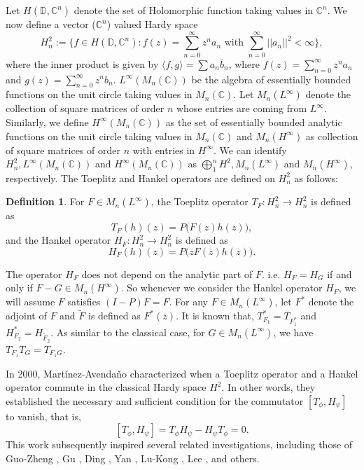 \documentclass[12pt, reqno]{amsart}
\theoremstyle{definition}
\newtheorem{definition}[theorem]{Definition}
\theoremstyle{remark}
\numberwithin{equation}{section}
\begin{document}
    
    Let $H(\mathbb{D}, \mathbb{C}^n)$ denote the set of Holomorphic function taking values in $\mathbb{C}^n.$ We now define a vector ($\mathbb{C}^n$) valued Hardy space 
    \begin{equation*}
        H^2_n:=\{f\in H(\mathbb{D}, \mathbb{C}^n): f(z)=\sum_{n=0}^{\infty}z^n a_n\text{ with } \sum_{n=0}^{\infty} ||a_n||^2 <  \infty \},
    \end{equation*}
    where the inner product is given by $\langle f,g\rangle=\sum a_n \overline b_n$, where $f(z)=\sum_{n=0}^{\infty}z^na_n$  and  $g(z)=\sum_{n=0}^{\infty}z^nb_n.$ $L^\infty(M_n(\mathbb{C}))$ be the algebra of essentially bounded functions on the unit circle taking values in $M_n(\mathbb{C}).$ Let $M_n(L^\infty)$ denote the collection of square matrices of order $n$ whose entries are coming from $L^\infty.$ Similarly, we define $H^\infty(M_n(\mathbb{C}))$ as the set of essentially bounded analytic functions on the unit circle taking values in $M_n(\mathbb{C})$ and $M_n(H^\infty)$ as collection of square matrices of order $n$ with entries in $H^\infty.$ We can identify
    $H^2_n, L^\infty(M_n(\mathbb{C}))$ and 
    $H^\infty(M_n(\mathbb{C}))$ as $\bigoplus_{1}^{n}H^2, M_n(L^\infty)$ and $M_n(H^\infty),$ respectively. The Toeplitz and Hankel operators are defined on $ H^2_n$ as follows:
    \begin{definition}
         For $F \in M_n(L^\infty)$, the Toeplitz operator $T_F : H^2_n\to H^2_n$ is defined as $$ T_F(h)(z)=P\big(F(z)h(z)\big), $$ 
         and the Hankel operator $H_F:H^2_n\to H^2_n$ is defined as $$  H_F(h)(z)=P\big(\overline{z}F(\overline{z})h(\overline{z})\big).$$
    \end{definition}
    
    The operator $H_F$ does not depend on the analytic part of $F$. i.e. $H_F=H_G$ if and only if $F-G \in M_n(H^\infty).$
    So whenever we consider the Hankel operator $H_F$, we will assume $F$ satisfies $(I-P)F = F$. For any $F \in M_n(L^\infty)$, 
    let $F^*$ denote the adjoint of $F$ and 
    $\widetilde F$ is defined as $F^*(\overline{z})$.
    It is known that, $T_{F_1}^*=T_{F_1^*}$ and $H_{F_2}^*=H_{\widetilde F_2}.$ As similar to the classical case, for $G \in M_n(L^\infty)$, we have
    $T_{F_1}T_G = T_{F_1 G}$.

   In 2000, Mart\'inez-Avenda\~no \cite{RAMA} characterized when a Toeplitz operator and a Hankel operator commute in the classical Hardy space $H^2$. In other words, they established the necessary and sufficient condition for the commutator $[T_\phi, H_\psi]$ to vanish, that is,
   $$[T_\phi, H_\psi]= T_\phi H_\psi - H_\psi T_\phi = 0 .$$ 
   This work subsequently inspired several related investigations, including those of Guo-Zheng \cite{GZ}, Gu \cite{CG}, Ding \cite{D}, Yan \cite{Y}, Lu-Kong \cite{LK}, Lee \cite{L}, and others.
\end{document}
